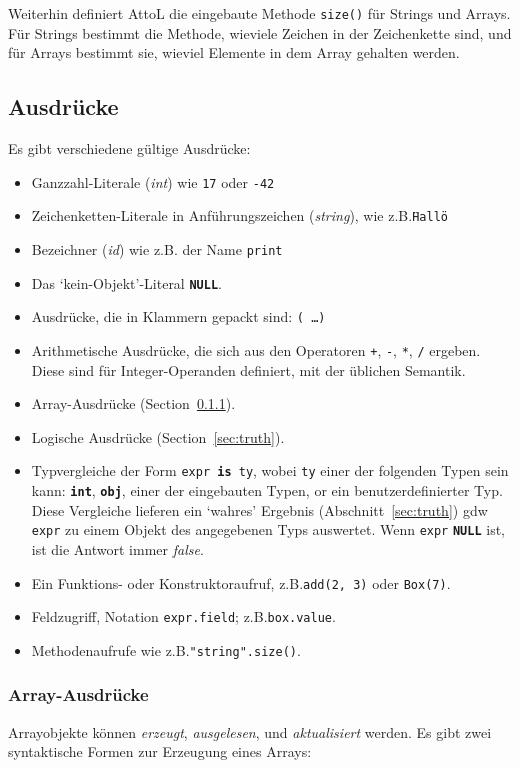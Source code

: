 \documentclass[11pt,a4paper]{article}
\newcommand{\Cty}[1]{\textcolor{dblue}{\texttt{#1}}}
\newcommand{\Ckw}[1]{\textbf{\texttt{#1}}}
\begin{document}
Weiterhin definiert AttoL die eingebaute Methode \texttt{size()} für Strings und Arrays.  Für Strings
bestimmt die Methode, wieviele Zeichen in der Zeichenkette sind, und für Arrays bestimmt sie, wieviel Elemente in dem Array gehalten werden.

\subsection{Ausdrücke}\label{sec:expr}
Es gibt verschiedene gültige Ausdrücke:
\begin{itemize}
\item Ganzzahl-Literale  (\textit{int}) wie \texttt{17} oder \texttt{-42}
\item Zeichenketten-Literale in Anführungszeichen (\textit{string}), wie z.B.\@ \texttt{\"{}Hallo\"}
\item Bezeichner (\textit{id}) wie z.B. der Name \texttt{print}
\item Das `kein-Objekt'-Literal \Ckw{NULL}.
\item Ausdrücke, die in Klammern gepackt sind: \texttt{( \ldots )}
\item Arithmetische Ausdrücke, die sich aus den Operatoren \texttt{+}, \texttt{-}, \texttt{*}, \texttt{/} ergeben.
  Diese sind für Integer-Operanden definiert, mit der üblichen Semantik.
\item Array-Ausdrücke (Section~\ref{sec:arrays}).
\item Logische Ausdrücke (Section~\ref{sec:truth}).
\item Typvergleiche der Form \texttt{expr \Ckw{is} \Cty{ty}}, wobei \Cty{ty} einer der folgenden Typen sein kann: \Ckw{int}, \Ckw{obj},
  einer der eingebauten Typen, or ein benutzerdefinierter Typ.  Diese Vergleiche lieferen ein `wahres' Ergebnis (Abschnitt~\ref{sec:truth}) gdw
  \texttt{expr} zu einem Objekt des angegebenen Typs auswertet.  Wenn \texttt{expr} \Ckw{NULL} ist, ist die Antwort immer \emph{false}.
\item Ein Funktions- oder Konstruktoraufruf, z.B.\@ \texttt{add(2, 3)} oder \texttt{Box(7)}.
\item Feldzugriff, Notation \texttt{expr.field}; z.B.\@ \texttt{box.value}.
\item Methodenaufrufe wie z.B.\@ \texttt{"string".size()}.
\end{itemize}

\subsubsection{Array-Ausdrücke}\label{sec:arrays}
Arrayobjekte können \emph{erzeugt}, \emph{ausgelesen}, und \emph{aktualisiert} werden.
Es gibt zwei syntaktische Formen zur Erzeugung eines Arrays:
\end{document}
